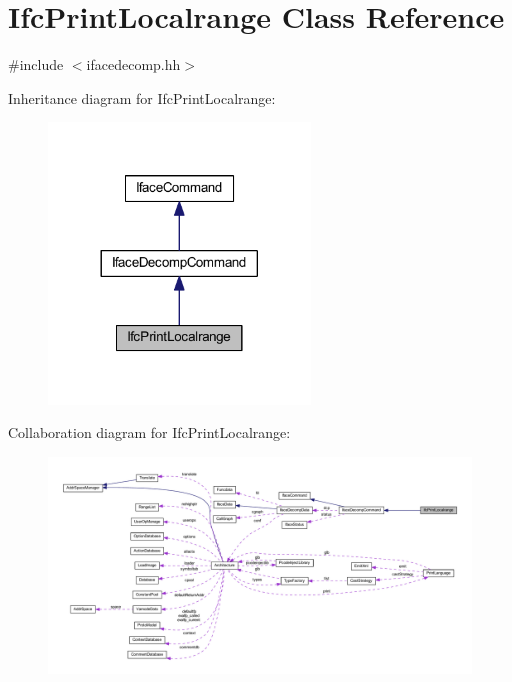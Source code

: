 \hypertarget{class_ifc_print_localrange}{}\section{Ifc\+Print\+Localrange Class Reference}
\label{class_ifc_print_localrange}


{\ttfamily \#include $<$ifacedecomp.\+hh$>$}



Inheritance diagram for Ifc\+Print\+Localrange\+:
\nopagebreak
\begin{figure}[H]
\begin{center}
\leavevmode
\includegraphics[width=197pt]{class_ifc_print_localrange__inherit__graph}
\end{center}
\end{figure}


Collaboration diagram for Ifc\+Print\+Localrange\+:
\nopagebreak
\begin{figure}[H]
\begin{center}
\leavevmode
\includegraphics[width=350pt]{class_ifc_print_localrange__coll__graph}
\end{center}
\end{figure}
